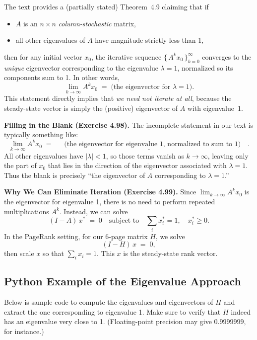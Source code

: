 \documentclass{article}
\begin{document}
\noindent
The text provides a (partially stated) Theorem~4.9 claiming that if
\begin{itemize}
  \item $A$ is an $n\times n$ \emph{column-stochastic} matrix, 
  \item all other eigenvalues of $A$ have magnitude strictly less than 1,
\end{itemize}
then for any initial vector $x_0$, the iterative sequence 
$\{\,A^k x_0\,\}_{k=0}^{\infty}$ converges to the \emph{unique} eigenvector 
corresponding to the eigenvalue $\lambda=1$, normalized so its components sum 
to 1. In other words, 
\[
\lim_{k\to\infty}A^k x_0 \;=\; \text{(the eigenvector for } \lambda=1 \text{)}.
\]
This statement directly implies that \emph{we need not iterate at all}, because 
the steady-state vector is simply the (positive) eigenvector of $A$ with eigenvalue~1.

\bigskip
\noindent
\textbf{Filling in the Blank (Exercise 4.98).}
The incomplete statement in our text is typically something like:
\[
\lim_{k\to\infty} A^k x_0 
\;=\;
\;\underline{\quad \text{(the eigenvector for eigenvalue }1\text{, normalized to sum to }1)}\quad.
\]
All other eigenvalues have $|\lambda|<1$, so those terms vanish as $k\to\infty$, 
leaving only the part of $x_0$ that lies in the direction of the eigenvector 
associated with $\lambda=1$. Thus the blank is precisely ``the eigenvector of $A$ 
corresponding to $\lambda=1$.''

\bigskip
\noindent
\textbf{Why We Can Eliminate Iteration (Exercise 4.99).}
Since $\lim_{k\to\infty} A^k x_0$ is the eigenvector for eigenvalue 1, 
there is no need to perform repeated multiplications $A^k$. Instead, we can solve
\[
(I - A)\,x^* \;=\; 0 
\quad\text{subject to}\quad
\sum_i x_i^* = 1, 
\quad x_i^* \ge 0.
\]
In the PageRank setting, for our 6-page matrix $H$, we solve
\[
(I - H)\,x \;=\; 0,
\]
then scale $x$ so that $\sum_i x_i = 1$. This $x$ is the steady-state rank vector.

\subsection{Python Example of the Eigenvalue Approach}
Below is sample code to compute the eigenvalues and eigenvectors of $H$ and extract 
the one corresponding to eigenvalue 1. Make sure to verify that $H$ indeed has an 
eigenvalue very close to 1. (Floating-point precision may give 0.9999999, for instance.)
\end{document}
